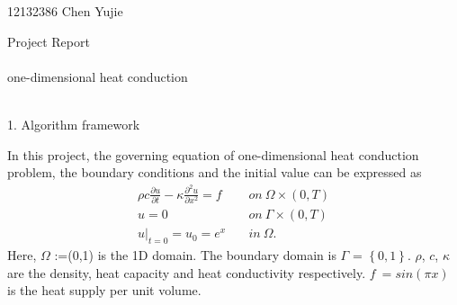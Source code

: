 \documentclass[a4paper,10pt]{article}
\begin{document}
12132386 Chen Yujie
\begin{center}
{\LARGE Project Report}
\\ \hspace*{\fill} \\
{\large one-dimensional heat conduction}
\\ \hspace*{\fill} \\
\end{center}

{\large 1. Algorithm framework}

In this project, the governing equation of one-dimensional heat conduction problem, the boundary conditions and the initial value can be expressed as
\begin{align}
\rho c\frac{\partial u}{\partial t}-\kappa \frac{\partial ^2 u}{\partial x^2}=f \quad &on\  \Omega \times (0,T) \\
u=0 \quad &on \  \Gamma \times (0,T) \\
u|_{t=0} =u_0 =  e^x \quad &in \ \Omega .
\end{align}
Here, $\Omega$ :=(0,1) is the 1D domain. The boundary domain is $\Gamma$ = $\left\{ 0,1 \right\} $. $\rho$, $c$, $\kappa$ are the density, heat capacity and heat conductivity respectively. $f \ =sin(\pi x)$ is the heat supply per unit volume. 
\end{document}
